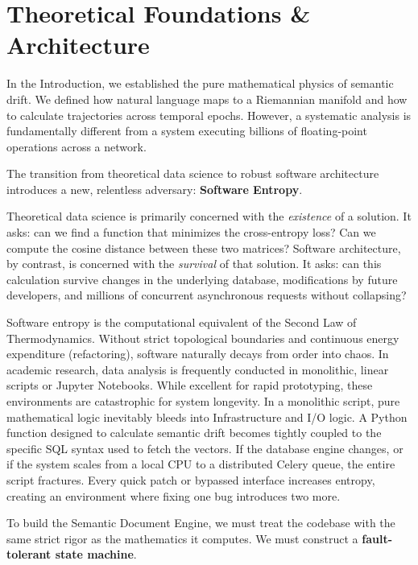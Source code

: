 
\chapter{Theoretical Foundations \& Architecture}

In the Introduction, we established the pure mathematical physics of semantic drift. We defined how natural language maps to a Riemannian manifold and how to calculate trajectories across temporal epochs. However, a systematic analysis is fundamentally different from a system executing billions of floating-point operations across a network.



The transition from theoretical data science to robust software architecture introduces a new, relentless adversary: \textbf{Software Entropy}.

Theoretical data science is primarily concerned with the \textit{existence} of a solution. It asks: can we find a function that minimizes the cross-entropy loss? Can we compute the cosine distance between these two matrices? Software architecture, by contrast, is concerned with the \textit{survival} of that solution. It asks: can this calculation survive changes in the underlying database, modifications by future developers, and millions of concurrent asynchronous requests without collapsing?

Software entropy is the computational equivalent of the Second Law of Thermodynamics. Without strict topological boundaries and continuous energy expenditure (refactoring), software naturally decays from order into chaos. In academic research, data analysis is frequently conducted in monolithic, linear scripts or Jupyter Notebooks. While excellent for rapid prototyping, these environments are catastrophic for system longevity. In a monolithic script, pure mathematical logic inevitably bleeds into Infrastructure and I/O logic. A Python function designed to calculate semantic drift becomes tightly coupled to the specific SQL syntax used to fetch the vectors. If the database engine changes, or if the system scales from a local CPU to a distributed Celery queue, the entire script fractures. Every quick patch or bypassed interface increases entropy, creating an environment where fixing one bug introduces two more.

To build the Semantic Document Engine, we must treat the codebase with the same strict rigor as the mathematics it computes. We must construct a \textbf{fault-tolerant state machine}.

